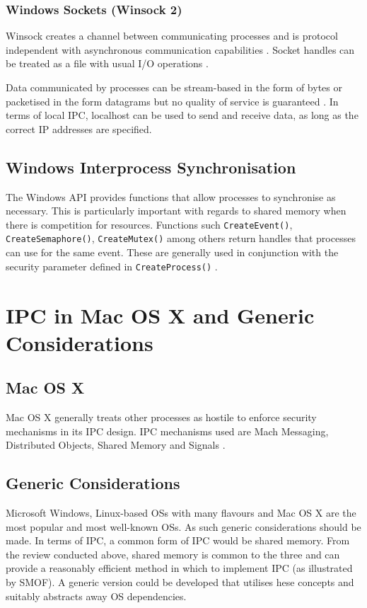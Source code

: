 \documentclass[12pt] {newrucsthesis}    %
\def\code#1{\texttt{#1}}
\begin{document}
        \subsubsection{Windows Sockets (Winsock 2)}
          Winsock creates a channel between communicating processes and is protocol independent with
          asynchronous communication capabilities \citep{lewandowski1997interprocess}. Socket handles
          can be treated as a file with usual I/O operations \citep{MSDN_API}.

          Data communicated by processes can be stream-based in the form of bytes or packetised in the form
          datagrams but no quality of service is guaranteed \citep{IPCWindowsLinkedInSlides}. In terms of local IPC,
          localhost can be used to send and receive data, as long as the correct IP addresses are specified.

      \subsection{Windows Interprocess Synchronisation}
        The Windows API provides functions that allow processes to synchronise as necessary. This is particularly
        important with regards to shared memory when there is competition for resources. Functions such \code{CreateEvent()},
        \code{CreateSemaphore()}, \code{CreateMutex()} among others return handles that processes can use for the same event.
        These are generally used in conjunction with the security parameter defined in \code{CreateProcess()} \citep{MSDN_API}.

    \section{IPC in Mac OS X and Generic Considerations}

      \subsection{Mac OS X}
        Mac OS X generally treats other processes as hostile to enforce security mechanisms in its IPC design.
        IPC mechanisms used are Mach Messaging, Distributed Objects, Shared Memory and Signals \citep{MAC_API}.

        \subsection{Generic Considerations}
          Microsoft Windows, Linux-based OSs with many flavours and Mac OS X are the most popular and most well-known OSs.
          As such generic considerations should be made. In terms of IPC, a common form of IPC would be shared memory.
          From the review conducted above, shared memory is common to the three and can provide a reasonably efficient
          method in which to implement IPC (as illustrated by SMOF). A generic version could be developed that utilises
          hese concepts and suitably abstracts away OS dependencies.
\end{document}
